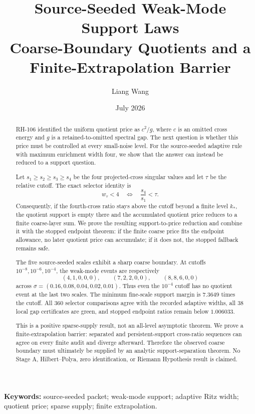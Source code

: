 \documentclass[11pt]{article}
\title{Source-Seeded Weak-Mode Support Laws\\
\large Coarse-Boundary Quotients and a Finite-Extrapolation Barrier}
\author{Liang Wang}
\date{July 2026}
\theoremstyle{definition}
\theoremstyle{remark}
\begin{document}
\maketitle

\begin{abstract}
RH-106 identified the uniform quotient price as $c^2/g$, where $c$ is an
omitted cross energy and $g$ is a retained-to-omitted spectral gap.  The next
question is whether this price must be controlled at every small-noise level.
For the source-seeded adaptive rule with maximum enrichment width four, we
show that the answer can instead be reduced to a support question.

Let $s_1\ge s_2\ge s_3\ge s_4$ be the four projected-cross singular values
and let $\tau$ be the relative cutoff.  The exact selector identity is
\[
 w_\tau<4\quad\Longleftrightarrow\quad
 \frac{s_4}{s_1}<\tau.
\]
Consequently, if the fourth-cross ratio stays above the cutoff beyond a
finite level $k_*$, the quotient support is empty there and the accumulated
quotient price reduces to a finite coarse-layer sum.  We prove the resulting
support-to-price reduction and combine it with the stopped endpoint theorem:
if the finite coarse price fits the endpoint allowance, no later quotient
price can accumulate; if it does not, the stopped fallback remains safe.

The five source-seeded scales exhibit a sharp coarse boundary.  At cutoffs
$10^{-8},10^{-6},10^{-4}$, the weak-mode events are respectively
\[
 (4,1,0,0,0),\qquad(7,2,2,0,0),\qquad(8,8,6,0,0)
\]
across $\sigma=(0.16,0.08,0.04,0.02,0.01)$.  Thus even the $10^{-4}$ cutoff
has no quotient event at the last two scales.  The minimum fine-scale
support margin is $7.3649$ times the cutoff.  All 360 selector comparisons
agree with the recorded adaptive widths, all 38 local gap certificates are
green, and stopped endpoint ratios remain below $1.006033$.

This is a positive sparse-supply result, not an all-level asymptotic theorem.
We prove a finite-extrapolation barrier: separated and persistent-support
cross-ratio sequences can agree on every finite audit and diverge afterward.
Therefore the observed coarse boundary must ultimately be supplied by an
analytic support-separation theorem.  No Stage A, Hilbert--Polya, zero
identification, or Riemann Hypothesis result is claimed.
\end{abstract}

\noindent\textbf{Keywords:} source-seeded packet; weak-mode support; adaptive
Ritz width; quotient price; sparse supply; finite extrapolation.
\end{document}
